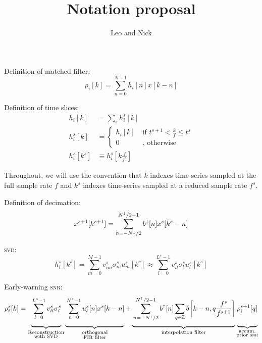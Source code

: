 \documentclass[letterpaper,11pt]{article}
\title{Notation proposal}
\author{Leo and Nick}
\begin{document}
\maketitle

Definition of matched filter:
\begin{equation}
\rho_i [k] = \sum_{n=0}^{N-1} h_{i}[n] x [k-n]
\end{equation}

Definition of time slices:
\begin{align}
h_{i}[k] &= \sum_s h_{i}^{s}[k] \\
h_{i}^{s}[k] &= \left\{ \begin{aligned}
    h_{i}[k] & \; \text{if } t^{s+1} < \frac{k}{f} \leq t^{s} \\
    0 & \; \text{, otherwise }
    \end{aligned} \right. \\
h_{i}^{s}[k^{s}] &\equiv h_{i}^{s}\!\left[k\frac{f}{f^{s}}\right]
\end{align}

Throughout, we will use the convention that $k$ indexes time-series sampled at the full sample rate $f$ and $k^s$ indexes time-series sampled at a reduced sample rate $f^s$.

Definition of decimation:
\begin{equation}
x^{s+1}[k^{s+1}] = \sum_{n=-N^\shortdownarrow/2}^{N^\shortdownarrow/2-1} b^\shortdownarrow[n] x^{s}\!\left[k^{s} - n\right]
\end{equation}

\textsc{svd}:
\begin{equation}
h^{s}_{i}\!\left[k^{s}\right] = \sum_{m=0}^{M-1} v^{s}_{im} \sigma^{s}_m u^{s}_{m}[k^{s}] \approx \sum_{l=0}^{L^s-1} v^{s}_{il} \sigma^{s}_l u^{s}_{l}[k^{s}]
\end{equation}

Early-warning \textsc{snr}:
\newcommand{\mystrut}{\rule[-2em]{0pt}{0pt}}  %
\begin{equation}
    \rho^{s}_i[k] = \underbrace{\mystrut\sum_{l=0}^{L^{s}-1} v^{s}_{il} \sigma^{s}_l}_{\substack{\text{Reconstruction}\\ \text{with {\sc SVD}}}}
    \underbrace{\mystrut\sum_{n=0}^{N^{s} - 1} u^{s}_{l}[n] x^{s}[k-n]}_{\substack{\text{orthogonal}\\ \text{{\sc FIR} filter}}} + \underbrace{\mystrut\sum_{n=-N^\shortuparrow/2}^{N^\shortuparrow/2-1} b^\shortuparrow[n] \sum_{q \in \mathbb{Z}} \delta\!\left[k-n, q \frac{f^{s}}{f^{s+1}}\right]}_\text{interpolation filter} \underbrace{\mystrut\rho^{s+1}_i[q]}_{\substack{\text{accum.}\\ \text{prior {\sc snr}}}}
\end{equation}
\end{document}
